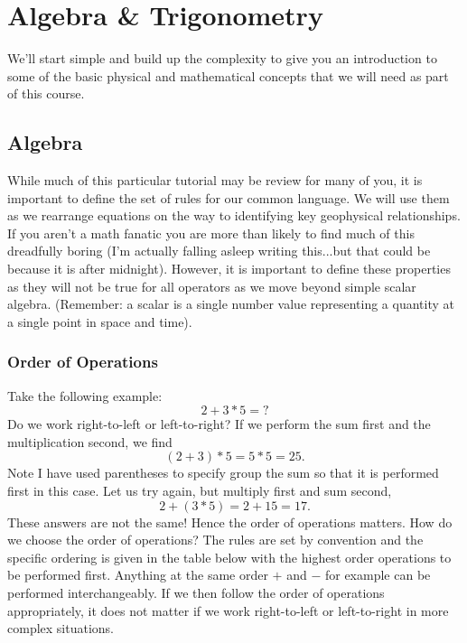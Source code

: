 \chapter{Algebra \& Trigonometry}\label{apx:algebra}

We'll start simple and build up the complexity to give you an introduction to
some of the basic physical and mathematical concepts that we will need as part
of this course.

\section{Algebra}

While much of this particular tutorial may be review for many of you, it is
important to define the set of rules for our common language.  We will use them
as we rearrange equations on the way to identifying key geophysical
relationships.  If you aren't a math fanatic you are more than likely to find
much of this dreadfully boring (I'm actually falling asleep writing this...but
that could be because it is after midnight).  However, it is important to define
these properties as they will not be true for all operators as we move beyond
simple scalar algebra.  (Remember: a scalar is a single number value
representing a quantity at a single point in space and time).

\subsection{Order of Operations}

Take the following example:
\begin{equation*}
    2 + 3 * 5 = ?
\end{equation*}
Do we work right-to-left or left-to-right?  If we perform the sum first and the
multiplication second, we find
\begin{equation*}
    (2 + 3) * 5 = 5 * 5 = 25 .
\end{equation*}
Note I have used parentheses to specify group the sum so that it is performed
first in this case.  Let us try again, but multiply first and sum second,
\begin{equation*}
    2 + (3 * 5) = 2 + 15 = 17 .
\end{equation*}
These answers are not the same! Hence the order of operations matters.  How do
we choose the order of operations?  The rules are set by convention and the
specific ordering is given in the table below with the highest order operations
to be performed first.  Anything at the same order $+$ and $-$ for example can
be performed interchangeably.  If we then follow the order of operations
appropriately, it does not matter if we work right-to-left or left-to-right in
more complex situations.

